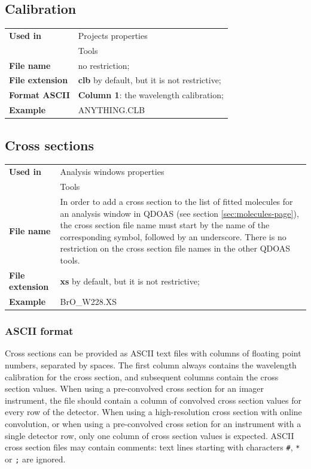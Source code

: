 \subsection{Calibration}\hfill
\begin{minipage}[t]{\textwidth}
\vspace{-0.6\baselineskip}
\begin{tabular}[h]{l p{8cm}}
\textbf{Used in} & Projects properties \\
                 & Tools \\ [6pt]
\textbf{File name} & 	no restriction;  \\ [6pt]
\textbf{File extension} & \textbf{clb} by default, but it is not restrictive;  \\ [6pt]
\textbf{Format ASCII} & \textbf{Column 1}: the wavelength calibration; \\ [6pt]
\textbf{Example} & ANYTHING.CLB
\end{tabular}
\end{minipage}

\subsection{Cross sections}\label{sec:cross-sections}\hfill
\begin{minipage}[t]{\textwidth}
\vspace{-0.6\baselineskip}
\begin{tabular}[h]{l p{8cm}}
\textbf{Used in} & Analysis windows properties \\
                 & Tools \\ [6pt]
\textbf{File name} & In order to add a cross section to the list of fitted molecules for an analysis window in QDOAS (see section \ref{sec:molecules-page}), the cross section file name must start by the name of the corresponding symbol, followed by an underscore.  There is no restriction on the cross section file names in the other QDOAS tools. \\ [6pt]
\textbf{File extension} & \textbf{xs} by default, but it is not restrictive; \\ [6pt]
\textbf{Example} & BrO\_W228.XS
\end{tabular}
\end{minipage}
\subsubsection{ASCII format}
Cross sections can be provided as ASCII text files with columns of floating point numbers, separated by spaces.  The first column always contains the wavelength calibration for the cross section, and subsequent columns contain the cross section values.  When using a pre-convolved cross section for an imager instrument, the file should contain a column of convolved cross section values for every row of the detector.  When using a high-resolution cross section with online convolution, or when using a pre-convolved cross setion for an instrument with a single detector row, only one column of cross section values is expected.  ASCII cross section files may contain comments: text lines starting with characters \texttt{\#}, \texttt{*} or \texttt{;} are ignored.

